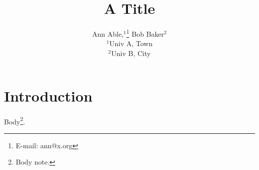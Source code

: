 \documentclass{mnras}
\title{A Title}
\author[A. Able et al.]{Ann Able,$^{1}$\thanks{E-mail: ann@x.org} Bob Baker$^{2}$\footnotemark[2]
\\ $^{1}$Univ A, Town\\ $^{2}$Univ B, City}
\begin{document}
\maketitle
{}
\section{Introduction}
Body\footnote{Body note.}.
\end{document}
